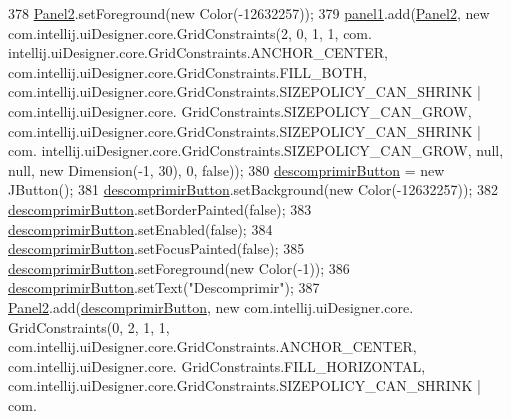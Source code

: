 \begin{DoxyCode}
378         \hyperlink{classpresentacion_1_1form_1_1mainForm_a40e87b5e341114287b070012a4aadc8f}{Panel2}.setForeground(\textcolor{keyword}{new} Color(-12632257));
379         \hyperlink{classpresentacion_1_1form_1_1mainForm_aa43e009cc6dc09d4e637385fbd361510}{panel1}.add(\hyperlink{classpresentacion_1_1form_1_1mainForm_a40e87b5e341114287b070012a4aadc8f}{Panel2}, \textcolor{keyword}{new} com.intellij.uiDesigner.core.GridConstraints(2, 0, 1, 1, com.
      intellij.uiDesigner.core.GridConstraints.ANCHOR\_CENTER, com.intellij.uiDesigner.core.GridConstraints.FILL\_BOTH,
       com.intellij.uiDesigner.core.GridConstraints.SIZEPOLICY\_CAN\_SHRINK | com.intellij.uiDesigner.core.
      GridConstraints.SIZEPOLICY\_CAN\_GROW, com.intellij.uiDesigner.core.GridConstraints.SIZEPOLICY\_CAN\_SHRINK | com.
      intellij.uiDesigner.core.GridConstraints.SIZEPOLICY\_CAN\_GROW, null, null, \textcolor{keyword}{new} Dimension(-1, 30), 0, \textcolor{keyword}{false}));
380         \hyperlink{classpresentacion_1_1form_1_1mainForm_a336e6855f8a19241d02376d4ff6a1802}{descomprimirButton} = \textcolor{keyword}{new} JButton();
381         \hyperlink{classpresentacion_1_1form_1_1mainForm_a336e6855f8a19241d02376d4ff6a1802}{descomprimirButton}.setBackground(\textcolor{keyword}{new} Color(-12632257));
382         \hyperlink{classpresentacion_1_1form_1_1mainForm_a336e6855f8a19241d02376d4ff6a1802}{descomprimirButton}.setBorderPainted(\textcolor{keyword}{false});
383         \hyperlink{classpresentacion_1_1form_1_1mainForm_a336e6855f8a19241d02376d4ff6a1802}{descomprimirButton}.setEnabled(\textcolor{keyword}{false});
384         \hyperlink{classpresentacion_1_1form_1_1mainForm_a336e6855f8a19241d02376d4ff6a1802}{descomprimirButton}.setFocusPainted(\textcolor{keyword}{false});
385         \hyperlink{classpresentacion_1_1form_1_1mainForm_a336e6855f8a19241d02376d4ff6a1802}{descomprimirButton}.setForeground(\textcolor{keyword}{new} Color(-1));
386         \hyperlink{classpresentacion_1_1form_1_1mainForm_a336e6855f8a19241d02376d4ff6a1802}{descomprimirButton}.setText(\textcolor{stringliteral}{"Descomprimir"});
387         \hyperlink{classpresentacion_1_1form_1_1mainForm_a40e87b5e341114287b070012a4aadc8f}{Panel2}.add(\hyperlink{classpresentacion_1_1form_1_1mainForm_a336e6855f8a19241d02376d4ff6a1802}{descomprimirButton}, \textcolor{keyword}{new} com.intellij.uiDesigner.core.
      GridConstraints(0, 2, 1, 1, com.intellij.uiDesigner.core.GridConstraints.ANCHOR\_CENTER, com.intellij.uiDesigner.core.
      GridConstraints.FILL\_HORIZONTAL, com.intellij.uiDesigner.core.GridConstraints.SIZEPOLICY\_CAN\_SHRINK | com.

\end{DoxyCode}
